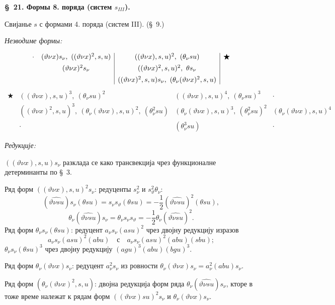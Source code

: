 ﻿\documentclass[11pt]{article}
\begin{document}
\begin{center}
\textbf{\S\ 21. \quad Формы 8. поряда (систем $s_{III}$).}
\end{center}

Свијанье $s$ с формами 4. поряда (систем III). (\S\ 9.)

\noindent\textit{Незводиме формы:}

\[
\begin{array}{c@{\quad}c|c|c}
\cdot
& (\vartheta\nu x)s_{\nu},\ ((\vartheta\nu x)^2,s,u)
& ((\vartheta\nu x),s,u)^2,\ (\theta_{\nu}su)
& \bigstar\\[0.45em]
& (\vartheta\nu x)^2s_{\nu}
& ((\vartheta\nu x)^2,s,u)^2,\ \theta s_{\nu}
& \\[0.45em]
&& ((\vartheta\nu x)^2,s,u)s_{\nu},\ (\theta_{\nu}(\vartheta\nu x)^2,s,u)
&
\end{array}
\]
\[
\begin{array}{c|c|c|c}
\bigstar
& ((\vartheta\nu x),s,u)^3,\ (\theta_{\nu}su)^2
& ((\vartheta\nu x),s,u)^4,\ (\theta_{\nu}su)^3
& \cdot\\[0.45em]
& ((\vartheta\nu x)^2,s,u)^3,\ (\theta_{\nu}(\vartheta\nu x),s,u)^2,\ (\theta_{\nu}^2su)
& (\theta_{\nu}(\vartheta\nu x),s,u)^3,\ (\theta_{\nu}^2su)^2
& (\theta_{\nu}(\vartheta\nu x),s,u)^4\\[0.45em]
& \cdot
& (\theta_{\nu}^3su)
& \cdot
\end{array}
\]

\noindent\textit{Редукције:}

$((\vartheta\nu x),s,u)s_{\nu}$ разклада се како трансвекција чрез функционалне детерминанты по \S\ 3.

Ряд форм $((\vartheta\nu x),s,u)^2s_{\nu}$: редуценты $s_{\nu}^2$ и $s_\vartheta^2\theta_{\nu}$:
\[
(\widehat{\vartheta\nu su})s_{\nu}(\theta su)=s_{\nu}s_\vartheta(\theta su)=-\frac12(\widehat{\vartheta\nu su})^2(\theta su),
\]
\[
\theta_{\nu}(\widehat{\vartheta\nu su})s_{\nu}=\theta_{\nu}s_{\nu}s_\vartheta=-\frac12\theta_{\nu}(\widehat{\vartheta\nu su})^2.
\]
Ряд форм $\theta_{\nu}s_{\nu}(\theta su)$: редуцент $a_{\nu}s_{\nu}(asu)^2$ чрез двојну редукцију изразов
\[
a_{\nu}s_{\nu}(asu)^2(abu)\quad\text{с}\quad a_{\nu}s_{\nu}(asu)^2(abu)(sbu);
\]
$\theta_{\nu}s_{\nu}(\theta su)^3$ чрез двојну редукцију $(agu)^3(abu)(bgu)^3$.

Ряд форм $\theta_{\nu}(\vartheta\nu x)s_{\nu}$: редуцент $a_{\nu}^2s_{\nu}$ из ровности $\theta_{\nu}(\vartheta\nu x)s_{\nu}=a_{\nu}^2(abu)s_{\nu}$.

Ряд форм $(\theta_{\nu}(\vartheta\nu x)^2,s,u)$: двојна редукција форм ряда $\theta_{\nu}(\widehat{\vartheta\nu su})s_{\nu}$, кторе в тоже време належат к рядам форм $((\vartheta\nu x)su)^2s_{\nu}$ и $\theta_{\nu}(\vartheta\nu x)s_{\nu}$.
\end{document}
